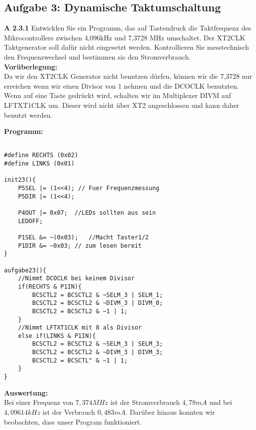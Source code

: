 \subsection*{Aufgabe 3: Dynamische Taktumschaltung}

\begin{description}

\item{\bfseries A 2.3.1} Entwicklen Sie ein Programm, das auf Tastendruck die Taktfrequenz des Mikrocontrollers zwischen 4,096kHz und 7,3728 MHz umschaltet. Der XT2CLK Taktgenerator soll dafür nicht eingesetzt werden. Kontrollieren Sie messtechnisch den Frequenzwechsel und bestimmen sie den Stromverbrauch.\\

\textbf{Vorüberlegung:}\\

Da wir den XT2CLK Generator nicht benutzen dürfen, können wir die 7,3728 nur erreichen wenn wir einen Divisor von 1 nehmen und die DCOCLK benutzten. Wenn auf eine Taste gedrückt wird, schalten wir im Multiplexer DIVM auf LFTXT1CLK um. Dieser wird nicht über XT2 angeschlossen und kann daher benutzt werden.

\textbf{Programm:}\\

\begin{lstlisting}

#define RECHTS (0x02)
#define LINKS (0x01)

init23(){
	P5SEL |= (1<<4); // Fuer Frequenzmessung
	P5DIR |= (1<<4);

	P4OUT |= 0x07;	//LEDs sollten aus sein
	LEDOFF;

	P1SEL &= ~(0x03);	//Macht Taster1/2
	P1DIR &= ~0x03;	// zum lesen bereit
}

aufgabe23(){
	//Nimmt DCOCLK bei keinem Divisor
	if(RECHTS & P1IN){
		BCSCTL2 = BCSCTL2 & ~SELM_3 | SELM_1;
		BCSCTL2 = BCSCTL2 & ~DIVM_3 | DIVM_0;
		BCSCTL2 = BCSCTL2 & ~1 | 1;
	} 
	//Nimmt LFTXT1CLK mit 8 als Divisor
	else if(LINKS & P1IN){
		BCSCTL2 = BCSCTL2 & ~SELM_3 | SELM_3;
		BCSCTL2 = BCSCTL2 & ~DIVM_3 | DIVM_3;
		BCSCTL2 = BCSCTL" & ~1 | 1;
	}
}

\end{lstlisting}

\textbf{Auswertung:}\\

Bei einer Frequenz von $7,374MHz$ ist der Stromverbrauch $4,78mA$ und bei $4,09614kHz$ ist der Verbrauch $0,483mA$. Darüber hinaus konnten wir beobachten, dass unser Program funktioniert.


\end{description}
